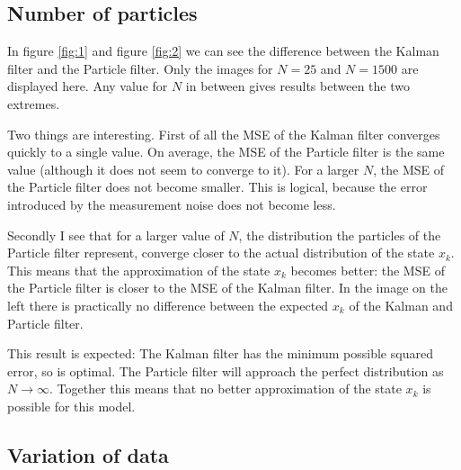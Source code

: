 \documentclass[paper=a4, fontsize=11pt]{scrartcl} %
\numberwithin{equation}{section} %
\numberwithin{figure}{section} %
\numberwithin{table}{section} %
\begin{document}
\subsection{Number of particles}

In figure \ref{fig:1} and figure \ref{fig:2} we can see the difference between the Kalman filter and the Particle filter. Only the images for $N=25$ and $N=1500$ are displayed here. Any value for $N$ in between gives results between the two extremes.

Two things are interesting. First of all the MSE of the Kalman filter converges quickly to a single value. On average, the MSE of the Particle filter is the same value (although it does not seem to converge to it). For a larger $N$, the MSE of the Particle filter does not become smaller. This is logical, because the error introduced by the measurement noise does not become less.

Secondly I see that for a larger value of $N$, the distribution the particles of the Particle filter represent, converge closer to the actual distribution of the state $x_k$. This means that the approximation of the state $x_k$ becomes better: the MSE of the Particle filter is closer to the MSE of the Kalman filter. In the image on the left there is practically no difference between the expected $x_k$ of the Kalman and Particle filter.

This result is expected: The Kalman filter has the minimum possible squared error, so is optimal. The Particle filter will approach the perfect distribution as $N \rightarrow \infty$. Together this means that no better approximation of the state $x_k$ is possible for this model.

\subsection{Variation of data}
\end{document}
